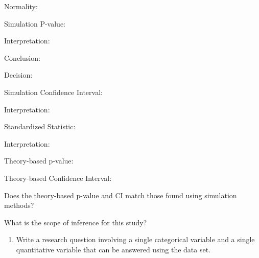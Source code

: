 \documentclass[
]{report}
\providecommand{\tightlist}{%
  \setlength{\itemsep}{0pt}\setlength{\parskip}{0pt}}
\newcommand{\rgi}{\hspace{24pt}}  %
\begin{document}
\vspace{0.8in}

\rgi \rgi Normality:

\vspace{0.8in}

\rgi Simulation P-value:

\vspace{0.3in}

\rgi \rgi Interpretation:

\vspace{0.8in}

\rgi \rgi Conclusion:

\vspace{0.8in}

\rgi \rgi Decision:

\vspace{0.3in}

\rgi Simulation Confidence Interval:

\vspace{0.3in}

\rgi \rgi Interpretation:

\vspace{0.8in}

\rgi Standardized Statistic:

\vspace{0.3in}

\rgi \rgi Interpretation:

\vspace{0.8in}

\rgi Theory-based p-value:

\vspace{0.3in}

\rgi Theory-based Confidence Interval:

\vspace{0.3in}

\rgi Does the theory-based p-value and CI match those found using simulation methods?

\vspace{0.8in}

\rgi What is the scope of inference for this study?

\vspace{0.8in}

\begin{enumerate}
\def\labelenumi{\arabic{enumi}.}
\setcounter{enumi}{2}
\tightlist
\item
  Write a research question involving a single categorical variable and a single quantitative variable that can be answered using the data set.
\end{enumerate}
\end{document}

